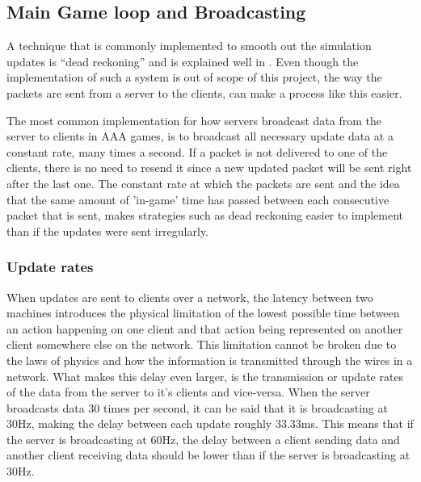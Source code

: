 \subsection{Main Game loop and Broadcasting}
A technique that is commonly implemented to smooth out the simulation updates is ``dead reckoning'' and is explained well in . Even though the implementation of such a system is out of scope of this project, the way the packets are sent from a server to the clients, can make a process like this easier.

The most common implementation for how servers broadcast data from the server to clients in AAA games, is to broadcast all necessary update data at a constant rate, many times a second. If a packet is not delivered to one of the clients, there is no need to resend it since a new updated packet will be sent right after the last one. The constant rate at which the packets are sent and the idea that the same amount of 'in-game' time has passed between each consecutive packet that is sent, makes strategies such as dead reckoning easier to implement than if the updates were sent irregularly.

\subsubsection{Update rates}
When updates are sent to clients over a network, the latency between two machines introduces the physical limitation of the lowest possible time between an action happening on one client and that action being represented on another client somewhere else on the network. This limitation cannot be broken due to the laws of physics and how the information is transmitted through the wires in a network. What makes this delay even larger, is the transmission or update rates of the data from the server to it's clients and vice-versa. When the server broadcasts data 30 times per second, it can be said that it is broadcasting at 30Hz, making the delay between each update roughly 33.33ms. This means that if the server is broadcasting at 60Hz, the delay between a client sending data and another client receiving data should be lower than if the server is broadcasting at 30Hz.

